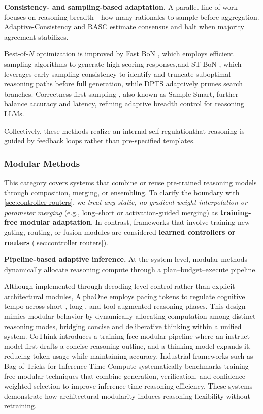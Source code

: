 \documentclass[11pt]{article}
\begin{document}
\textbf{Consistency- and sampling-based adaptation.}
A parallel line of work focuses on reasoning breadth—how many rationales to sample before aggregation.
{Adaptive-Consistency} \citep{aggarwal2023letssamplestepstep} and {RASC} \citep{wan2025reasoningawareselfconsistencyleveraging} estimate consensus and halt when majority agreement stabilizes.

Best-of-$N$ optimization is improved by {Fast BoN} \citep{Sun2024FastBoN}, which employs efficient sampling algorithms to generate high-scoring responses,and {ST-BoN} \citep{Wang2025STBoN}, which leverages early sampling consistency to identify and truncate suboptimal reasoning paths before full generation, while {DPTS} \citep{Ding2025DPTS} adaptively prunes search branches.
Correctness-first sampling \citep{Li2025SampleSmartNotHard}, also known as Sample Smart, further balance accuracy and latency, refining adaptive breadth control for reasoning LLMs.

Collectively, these methods realize an {internal self-regulation}that reasoning is guided by feedback loops rather than pre-specified templates.

\subsubsection{Modular Methods}
\label{sec:modular}


This category covers systems that combine or reuse pre-trained reasoning models through composition, merging, or ensembling.
To clarify the boundary with \ref{sec:controller routers}, we \emph{treat any static, no-gradient weight interpolation or parameter merging} (e.g., long–short or activation-guided merging) 
as \textbf{training-free modular adaptation}.
In contrast, frameworks that involve training new gating, routing, or fusion modules are considered \textbf{learned controllers or routers} (\ref{sec:controller routers}).

\textbf{Pipeline-based adaptive inference.}
At the system level, modular methods dynamically allocate reasoning compute through a plan–budget–execute pipeline.

Although implemented through decoding-level control rather than explicit architectural modules,
{AlphaOne} \citep{Zhang2025AlphaOne}
employs pacing tokens to regulate cognitive tempo across short-, long-, and tool-augmented reasoning phases.
This design mimics modular behavior by dynamically allocating computation among distinct reasoning modes,
bridging concise and deliberative thinking within a unified system. CoThink \citep{fan2025cothink} introduces a training-free modular pipeline where an instruct model first drafts a concise reasoning outline, and a thinking model expands it, reducing token usage while maintaining accuracy.
Industrial frameworks such as {Bag-of-Tricks for Inference-Time Compute} \citep{liu2025bagtricksinferencetimecomputation} 
systematically benchmarks training-free modular techniques that combine generation, verification, and confidence-weighted selection to improve inference-time reasoning efficiency. These systems demonstrate how architectural modularity induces reasoning flexibility without retraining. 
\end{document}

